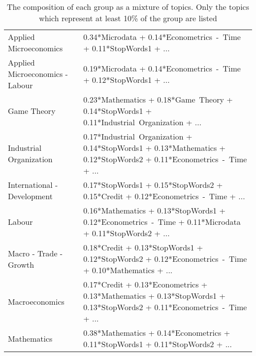 \begin{table}[tb]
\centering
\caption[Groups-Topics]{The composition of each group as a mixture of topics. Only the topics which represent at least 10\% of the group are listed}
\label{tab:gt}
\begin{tabularx}{\hsize}{lY}
\toprule
         Applied Microeconomics &                                                        0.34*Microdata + 0.14*Econometrics~-~Time + 0.11*StopWords1 + ... \\
Applied Microeconomics - Labour &                                                        0.19*Microdata + 0.14*Econometrics~-~Time + 0.12*StopWords1 + ... \\
                    Game Theory &                               0.23*Mathematics + 0.18*Game~Theory + 0.14*StopWords1 + 0.11*Industrial~Organization + ... \\
        Industrial Organization &     0.17*Industrial~Organization + 0.14*StopWords1 + 0.13*Mathematics + 0.12*StopWords2 + 0.11*Econometrics~-~Time + ... \\
    International - Development &                                         0.17*StopWords1 + 0.15*StopWords2 + 0.15*Credit + 0.12*Econometrics~-~Time + ... \\
                         Labour &                   0.16*Mathematics + 0.13*StopWords1 + 0.12*Econometrics~-~Time + 0.11*Microdata + 0.11*StopWords2 + ... \\
         Macro - Trade - Growth &                      0.18*Credit + 0.13*StopWords1 + 0.12*StopWords2 + 0.12*Econometrics~-~Time + 0.10*Mathematics + ... \\
                 Macroeconomics &  0.17*Credit + 0.13*Econometrics + 0.13*Mathematics + 0.13*StopWords1 + 0.13*StopWords2 + 0.11*Econometrics~-~Time + ... \\
                    Mathematics &                                           0.38*Mathematics + 0.14*Econometrics + 0.11*StopWords1 + 0.11*StopWords2 + ... \\
\bottomrule
\end{tabularx}
\end{table}
